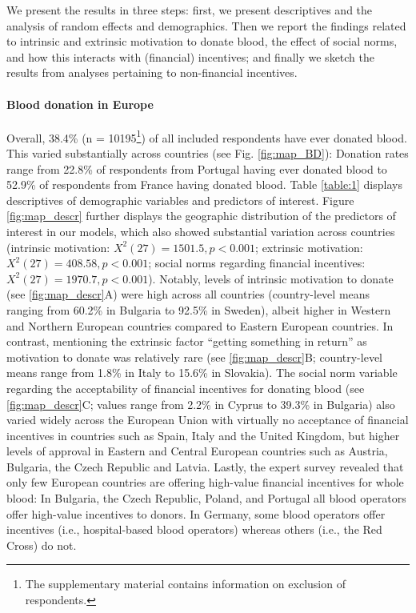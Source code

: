 \documentclass[AER]{AEA}
\begin{document}
We present the results in three steps: first, we present descriptives and the analysis of random effects and demographics. Then we report the findings related to intrinsic and extrinsic motivation to donate blood, the effect of social norms, and how this interacts with (financial) incentives; and finally we sketch the results from analyses pertaining to non-financial incentives.

\paragraph{Blood donation in Europe}

Overall, 38.4\% (n = 10195\footnote{The supplementary material contains information on exclusion of respondents.}) of all included respondents have ever donated blood. This varied substantially across countries (see Fig. \ref{fig:map_BD}): Donation rates range from 22.8\% of respondents from Portugal having ever donated blood to 52.9\% of respondents from France having donated blood. Table \ref{table:1} displays descriptives of demographic variables and predictors of interest. Figure \ref{fig:map_descr} further displays the geographic distribution of the predictors of interest in our models, which also showed substantial variation across countries (intrinsic motivation: ${X}^2(27) = 1501.5, p < 0.001$; extrinsic motivation: ${X}^2(27)= 408.58, p < 0.001$; social norms regarding financial incentives: ${X}^2(27) = 1970.7, p < 0.001$). Notably, levels of intrinsic motivation to donate (see \ref{fig:map_descr}A) were high across all countries (country-level means ranging from 60.2\% in Bulgaria to 92.5\% in Sweden), albeit higher in Western and Northern European countries compared to Eastern European countries. In contrast, mentioning the extrinsic factor “getting something in return” as motivation to donate was relatively rare (see \ref{fig:map_descr}B; country-level means range from 1.8\% in Italy to 15.6\% in Slovakia). The social norm variable regarding the acceptability of financial incentives for donating blood (see \ref{fig:map_descr}C; values range from 2.2\% in Cyprus to 39.3\% in Bulgaria) also varied widely across the European Union with virtually no acceptance of financial incentives in countries such as Spain, Italy and the United Kingdom, but higher levels of approval in Eastern and Central European countries such as Austria, Bulgaria, the Czech Republic and Latvia. Lastly, the expert survey revealed that only few European countries are offering high-value financial incentives for whole blood: In Bulgaria, the Czech Republic, Poland, and Portugal all blood operators offer high-value incentives to donors. In Germany, some blood operators offer incentives (i.e., hospital-based blood operators) whereas others (i.e., the Red Cross) do not.
\end{document}
